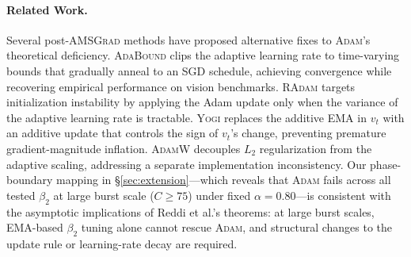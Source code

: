 \paragraph{Related Work.}
Several post-\textsc{AMSGrad} methods have proposed alternative fixes to \textsc{Adam}'s theoretical deficiency. \textsc{AdaBound} \citep{luo2019adaptive} clips the adaptive learning rate to time-varying bounds that gradually anneal to an SGD schedule, achieving convergence while recovering empirical performance on vision benchmarks. \textsc{RAdam} \citep{liu2019variance} targets initialization instability by applying the Adam update only when the variance of the adaptive learning rate is tractable. \textsc{Yogi} \citep{zaheer2018adaptive} replaces the additive EMA in $v_t$ with an additive update that controls the sign of $v_t$'s change, preventing premature gradient-magnitude inflation. \textsc{AdamW} \citep{loshchilov2019decoupled} decouples $L_2$ regularization from the adaptive scaling, addressing a separate implementation inconsistency. Our phase-boundary mapping in \S\ref{sec:extension}---which reveals that \textsc{Adam} fails across all tested $\beta_2$ at large burst scale ($C \ge 75$) under fixed $\alpha=0.80$---is consistent with the asymptotic implications of Reddi et al.'s theorems: at large burst scales, EMA-based $\beta_2$ tuning alone cannot rescue \textsc{Adam}, and structural changes to the update rule or learning-rate decay are required.

